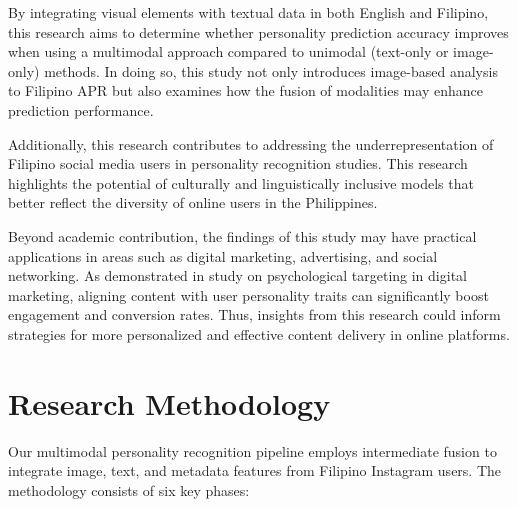 By integrating visual elements with textual data in both English and Filipino, this research aims to determine whether personality prediction accuracy improves when using a multimodal approach compared to unimodal (text-only or image-only) methods. In doing so, this study not only introduces image-based analysis to Filipino APR but also examines how the fusion of modalities may enhance prediction performance.

Additionally, this research contributes to addressing the underrepresentation of Filipino social media users in personality recognition studies. This research highlights the potential of culturally and linguistically inclusive models that better reflect the diversity of online users in the Philippines.

Beyond academic contribution, the findings of this study may have practical applications in areas such as digital marketing, advertising, and social networking. As demonstrated in \citet{Matz2017} study on psychological targeting in digital marketing, aligning content with user personality traits can significantly boost engagement and conversion rates. Thus, insights from this research could inform strategies for more personalized and effective content delivery in online platforms.




%
%
\section{Research Methodology}
\label{sec:methodology}


Our multimodal personality recognition pipeline employs intermediate fusion to integrate image, text, and metadata features from Filipino Instagram users. The methodology consists of six key phases:

